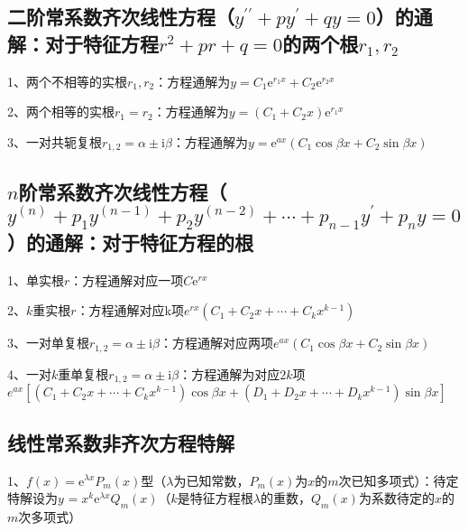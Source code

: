 \subsection{二阶常系数齐次线性方程（$y^{\prime \prime}+p y^{\prime}+q y=0$）的通解：对于特征方程$r^{2}+p r+q=0$的两个根$ r_{1}, r_{2} $}

1、两个不相等的实根$r_{1}, r_{2}$：方程通解为$ y=C_{1} \mathrm{e}^{r_1 x}+C_{2} \mathrm{e}^{r_2 x}$

2、两个相等的实根$r_{1}=r_{2}$：方程通解为$y=\left(C_{1}+C_{2} x\right) \mathrm{e}^{r_1 x}$

3、一对共轭复根$r_{1,2}=\alpha \pm \mathrm{i} \beta$：方程通解为$y=\mathrm{e}^{a x}\left(C_{1} \cos \beta x+C_{2} \sin \beta x\right)$



\subsection{$n$阶常系数齐次线性方程（$y^{(n)}+p_{1} y^{(n-1)}+p_{2} y^{(n-2)}+\cdots+p_{n-1} y^{\prime}+p_{n} y=0$）的通解：对于特征方程的根}

1、单实根$r$：方程通解对应一项$ C \mathrm{e}^{rx}$

2、$k$重实根$r$：方程通解对应k项${e}^{r x}\left(C_{1}+C_{2} x+\cdots+C_{k} x^{k-1}\right)$

3、一对单复根$r_{1,2}=\alpha \pm \mathrm{i} \beta$：方程通解对应两项${e}^{a x}\left(C_{1} \cos \beta x+C_{2} \sin \beta x\right)$

4、一对$k$重单复根$r_{1,2}=\alpha \pm \mathrm{i} \beta$：方程通解为对应$2k$项${e}^{{ax}}[(C_{1}+C_{2} x+\cdots+C_{k} x^{k-1}) \cos \beta x+(D_{1}+D_{2} x+\cdots+D_{k} x^{k-1}) \sin \beta x]$



\subsection{线性常系数非齐次方程特解}

1、$f(x)=\mathrm{e}^{\lambda x} P_{m}(x)$型（$\lambda$为已知常数，$P_{m}(x)$为$x$的$m$次已知多项式）：待定特解设为$y^{}=x^{k} \mathrm{e}^{\lambda x} Q_{m}(x)$（$k$是特征方程根$\lambda$的重数，$Q_{m}(x)$为系数待定的$x$的$m$次多项式）

